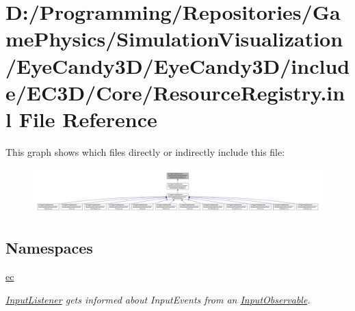 \hypertarget{_resource_registry_8inl}{}\section{D\+:/\+Programming/\+Repositories/\+Game\+Physics/\+Simulation\+Visualization/\+Eye\+Candy3\+D/\+Eye\+Candy3\+D/include/\+E\+C3\+D/\+Core/\+Resource\+Registry.inl File Reference}
\label{_resource_registry_8inl}
This graph shows which files directly or indirectly include this file\+:\nopagebreak
\begin{figure}[H]
\begin{center}
\leavevmode
\includegraphics[width=350pt]{_resource_registry_8inl__dep__incl}
\end{center}
\end{figure}
\subsection*{Namespaces}
\begin{DoxyCompactItemize}
\item 
 \mbox{\hyperlink{namespaceec}{ec}}
\begin{DoxyCompactList}\small\item\em \mbox{\hyperlink{classec_1_1_input_listener}{Input\+Listener}} gets informed about Input\+Events from an \mbox{\hyperlink{classec_1_1_input_observable}{Input\+Observable}}. \end{DoxyCompactList}\end{DoxyCompactItemize}
